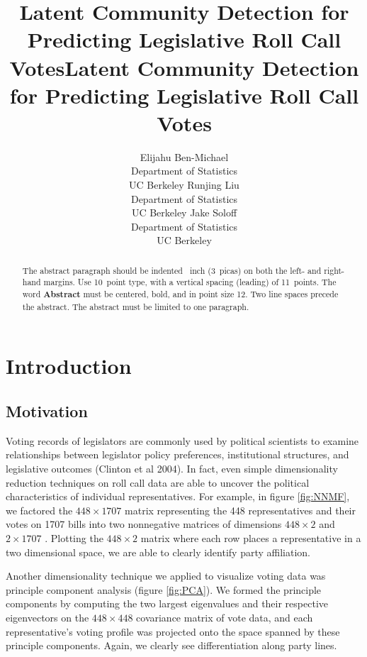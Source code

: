 \documentclass{article}
\title{Latent Community Detection for Predicting Legislative Roll Call Votes}
\title{Latent Community Detection \\
for Predicting Legislative Roll Call Votes}
\author{
  Elijahu Ben-Michael \\
  Department of Statistics\\
  UC Berkeley
   \And
  Runjing Liu \\
  Department of Statistics\\
  UC Berkeley
   \And
  Jake Soloff \\
  Department of Statistics\\
  UC Berkeley
}
\begin{document}

\maketitle

\vspace{-1em}

\begin{abstract}
  The abstract paragraph should be indented ~inch
  (3~picas) on both the left- and right-hand margins. Use 10~point
  type, with a vertical spacing (leading) of 11~points.  The word
  \textbf{Abstract} must be centered, bold, and in point size 12. Two
  line spaces precede the abstract. The abstract must be limited to
  one paragraph.
\end{abstract}

\section{Introduction}
\label{introduction}




\subsection{Motivation} 

Voting records of legislators are commonly used by political scientists to examine relationships between legislator policy preferences, institutional structures, and legislative outcomes (Clinton et al 2004). In fact, even simple dimensionality reduction techniques on roll call data are able to uncover the political characteristics of individual representatives. For example, in figure \ref{fig:NNMF}, we factored the $448\times1707$ matrix representing the 448 representatives and their votes on 1707 bills into two nonnegative matrices of dimensions $448\times 2$ and $2\times 1707$ . Plotting the  $448\times 2$ matrix where each row places a representative in a two dimensional space, we are able to clearly identify party affiliation. \par

Another dimensionality technique we applied to visualize voting data was principle component analysis (figure \ref{fig:PCA}). We formed the principle components by computing the two largest eigenvalues and their respective eigenvectors on the $448\times 448$ covariance matrix of vote data, and each representative's voting profile was projected onto the space spanned by these principle components. Again, we clearly see differentiation along party lines. 
\end{document}
